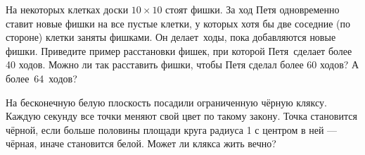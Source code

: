 \documentclass[a4paper,12pt]{article}
\begin{document}
На некоторых клетках доски $10\times10$ стоят фишки. За %
ход Петя
одновременно ставит новые фишки на все пустые клетки,
у которых хотя бы две соседние (по стороне) клетки заняты фишками.
Он делает~ходы, пока добавляются новые фишки. %
 Приведите пример расстановки фишек,
при которой Петя~сделает более 40 ходов.
 Можно ли так расставить
фишки, чтобы Петя сделал более 60 ходов?
 А более~64~ходов?

На бесконечную белую плоскость посадили ограниченную чёрную кляксу. Каждую секунду все точки меняют свой цвет по такому закону. Точка становится чёрной, если больше половины площади круга радиуса 1 с центром в ней --- чёрная, иначе становится белой. Может ли клякса жить вечно?



\vspace*{-2mm}
\vspace*{-3mm}




\end{document}
